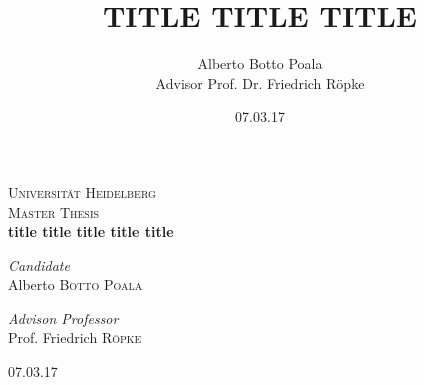 \documentclass[11pt]{article}
\title{TITLE TITLE TITLE}
\author{Alberto Botto Poala\\
Advisor Prof. Dr. Friedrich Röpke}
\date{07.03.17}
\numberwithin{equation}{section}
\begin{document}
\begin{titlepage}
\begin{center}


\textsc{\LARGE Universität Heidelberg}\\[1.8cm]

\textsc{\Large Master Thesis}\\[0.5cm]


{ \huge \bfseries title title title title title \\[0.5cm] }



\begin{minipage}{0.4\textwidth}
\begin{flushleft} \large
\emph{Candidate}\\
Alberto \textsc{Botto Poala}
\end{flushleft}
\end{minipage}
\begin{minipage}{0.4\textwidth}
\begin{flushright} \large
\emph{Advison Professor} \\
Prof. Friedrich \textsc{Röpke}
\end{flushright}
\end{minipage}

\vfill

{07.03.17}

\end{center}
\end{titlepage}

\tableofcontents
\maketitle

\end{document}
